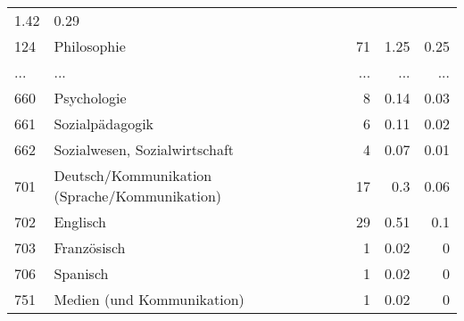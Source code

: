 \begin{longtable}{lXrrr}
          \num[round-mode=places,round-precision=2]{1.42} &
          \num[round-mode=places,round-precision=2]{0.29} \\
        124 & \multicolumn{1}{X}{Philosophie} & %
          \num{71} &
          \num[round-mode=places,round-precision=2]{1.25} &
          \num[round-mode=places,round-precision=2]{0.25} \\
       ... & ... & ... & ... & ... \\
        660 & \multicolumn{1}{X}{Psychologie} & %
          \num{8} &
          \num[round-mode=places,round-precision=2]{0.14} &
          \num[round-mode=places,round-precision=2]{0.03} \\

        661 & \multicolumn{1}{X}{Sozialpädagogik} & %
          \num{6} &
          \num[round-mode=places,round-precision=2]{0.11} &
          \num[round-mode=places,round-precision=2]{0.02} \\

        662 & \multicolumn{1}{X}{Sozialwesen, Sozialwirtschaft} & %
          \num{4} &
          \num[round-mode=places,round-precision=2]{0.07} &
          \num[round-mode=places,round-precision=2]{0.01} \\

        701 & \multicolumn{1}{X}{Deutsch/Kommunikation (Sprache/Kommunikation)} & %
          \num{17} &
          \num[round-mode=places,round-precision=2]{0.3} &
          \num[round-mode=places,round-precision=2]{0.06} \\

        702 & \multicolumn{1}{X}{Englisch} & %
          \num{29} &
          \num[round-mode=places,round-precision=2]{0.51} &
          \num[round-mode=places,round-precision=2]{0.1} \\

        703 & \multicolumn{1}{X}{Französisch} & %
          \num{1} &
          \num[round-mode=places,round-precision=2]{0.02} &
          \num[round-mode=places,round-precision=2]{0} \\

        706 & \multicolumn{1}{X}{Spanisch} & %
          \num{1} &
          \num[round-mode=places,round-precision=2]{0.02} &
          \num[round-mode=places,round-precision=2]{0} \\

        751 & \multicolumn{1}{X}{Medien (und Kommunikation)} & %
          \num{1} &
          \num[round-mode=places,round-precision=2]{0.02} &
          \num[round-mode=places,round-precision=2]{0} \\


\end{longtable}
